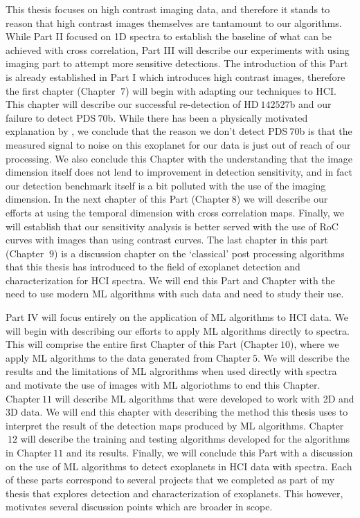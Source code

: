 This thesis focuses on high contrast imaging data, and therefore it stands to reason that high contrast images themselves are tantamount to our algorithms.
While Part II focused on 1D spectra to establish the baseline of what can be achieved with cross correlation, Part III will describe our experiments with using imaging part to attempt more sensitive detections.
The introduction of this Part is already established in Part I which introduces high contrast images, therefore the first chapter (Chapter $~7$) will begin with adapting our techniques to HCI.
This chapter will describe our successful re-detection of HD$~142527$b and our failure to detect PDS$~70$b. 
While there has been a physically motivated explanation by \cite{2023Cugno}, we conclude that the reason we don't detect PDS$~70$b is that the measured signal to noise on this exoplanet for our data is just out of reach of our processing.
We also conclude this Chapter with the understanding that the image dimension itself does not lend to improvement in detection sensitivity, and in fact our detection benchmark itself is a bit polluted with the use of the imaging dimension.
In the next chapter of this Part (Chapter$~8$) we will describe our efforts at using the temporal dimension with cross correlation maps. 
Finally, we will establish that our sensitivity analysis is better served with the use of RoC curves with images than using contrast curves.
The last chapter in this part (Chapter $~9$) is a discussion chapter on the `classical' post processing algorithms that this thesis has introduced to the field of exoplanet detection and characterization for HCI spectra.
We will end this Part and Chapter with the need to use modern ML algorithms with such data and need to study their use.

Part IV will focus entirely on the application of ML algorithms to HCI data.
We will begin with describing our efforts to apply ML algorithms directly to spectra. 
This will comprise the entire first Chapter of this Part (Chapter$~10$), where we apply ML algorithms to the data generated from Chapter$~5$. 
We will describe the results and the limitations of ML algrorithms when used directly with spectra and motivate the use of images with ML algoriothms to end this Chapter.
Chapter$~11$ will describe ML algorithms that were developed to work with 2D and 3D data.
We will end this chapter with describing the method this thesis uses to interpret the result of the detection maps produced by ML algorithms.
Chapter$~12$ will describe the training and testing algorithms developed for the algorithms in Chapter$~11$ and its results. 
Finally, we will conclude this Part with a discussion on the use of ML algorithms to detect exoplanets in HCI data with spectra.
Each of these parts correspond to several projects that we completed as part of my thesis that explores detection and characterization of exoplanets.
This however, motivates several discussion points which are broader in scope.

